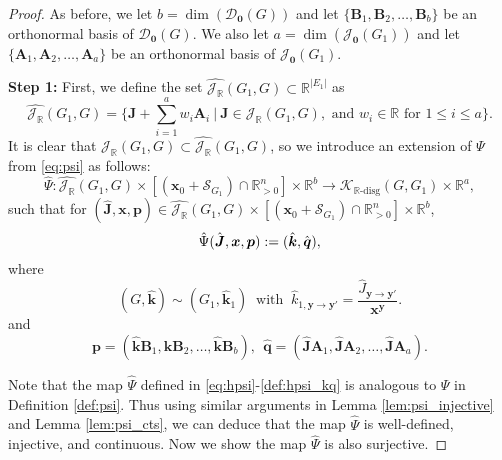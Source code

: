 \documentclass[11pt]{article}
\theoremstyle{plain}
\theoremstyle{definition}
\theoremstyle{remark}
\newcommand\RR{\mathbb{R}}
\newcommand\by{\boldsymbol{y}}
\newcommand\bk{\boldsymbol{k}}
\newcommand\bx{\boldsymbol{x}}
\newcommand\bA{\boldsymbol{A}}
\newcommand\bB{\boldsymbol{B}}
\newcommand\bq{\boldsymbol{q}}
\newcommand\bp{\boldsymbol{p}}
\newcommand\bJ{\boldsymbol{J}}
\newcommand{\dK}{\mathcal{K}_{\RR\text{-disg}}}
\newcommand{\mJ}{\mathcal{J}_{\RR}}
\newcommand{\eJ}{\mathcal{J}_{\textbf{0}}}
\newcommand{\mD}{\mathcal{D}_{\textbf{0}}}
\newcommand{\mS}{\mathcal{S}}
\begin{document}
\begin{proof}

As before, we let $b = \dim(\mD(G))$ and let $\{\bB_1, \bB_2, \ldots, \bB_b\}$ be an orthonormal basis of $\mD(G)$.
We also let $a = \dim(\eJ(G_1))$ and let $\{\bA_1, \bA_2, \ldots, \bA_a \}$ be an orthonormal basis of $\eJ(G_1)$.

\medskip

\textbf{Step 1: }
First, we define the set $\hat{\mJ} (G_1,G) \subset \RR^{|E_1|}$ as 
\begin{equation}
\label{def:hat_j_g1_g}
\hat{\mJ} (G_1,G) = \{ \bJ + \sum\limits^a_{i=1} w_i \bA_i \ | \ \bJ \in \mJ (G_1,G), \text{ and } w_i \in \RR \text{ for } 1 \leq i \leq a \}.
\end{equation}
It is clear that $\mJ (G_1,G) \subset \hat{\mJ} (G_1,G)$, so we introduce an 
extension of $\Psi$ from \eqref{eq:psi} as follows:
\begin{equation} \label{eq:hpsi}
\hat{\Psi}: \hat{\mJ} (G_1,G) \times [(\bx_0 + \mS_{G_1} )\cap\mathbb{R}^n_{>0}] \times \RR^b \rightarrow \dK(G,G_1)\times \RR^a,
\end{equation}
such that for $(\hat{\bJ}, \bx, \bp) \in \hat{\mJ} (G_1,G) \times [(\bx_0 + \mS_{G_1} )\cap\mathbb{R}^n_{>0}] \times \mathbb{R}^b$, 
\begin{equation} \notag
\hat{\Psi} (\hat{\bJ},\bx, \bp) 
: = (\hat{\bk}, \hat{\bq}),
\end{equation}
where
\begin{equation} \label{def:hpsi_k}
(G, \hat{\bk}) \sim (G_1, \hat{\bk}_1) \ \text{ with } \ \hat{k}_{1, \by\rightarrow \by'} = \frac{\hat{J}_{\by\rightarrow \by'}}{{\bx}^{\by}}.
\end{equation} 
and
\begin{equation} \label{def:hpsi_kq}
\bp = (\hat{\bk} \bB_1, \hat{\bk} \bB_2, \ldots, \hat{\bk} \bB_b), 
\ \
\hat{\bq} = (\hat{\bJ} \bA_1, \hat{\bJ} \bA_2, \ldots, \hat{\bJ} \bA_a).
\end{equation}

Note that the map $\hat{\Psi}$ defined in \eqref{eq:hpsi}-\eqref{def:hpsi_kq} is analogous to $\Psi$ in Definition \ref{def:psi}.
Thus using similar arguments in Lemma \ref{lem:psi_injective} and Lemma \ref{lem:psi_cts}, we can deduce that the map $\hat{\Psi}$ is well-defined, injective, and continuous. Now we show the map $\hat{\Psi}$ is also surjective. 


\end{proof}
\end{document}
